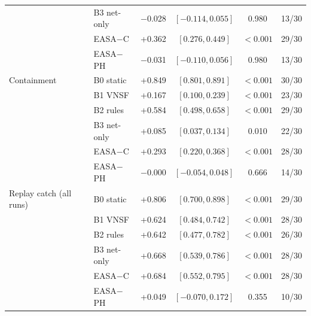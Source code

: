\begin{table}[!t]
\begin{tabular}{llcccc}
 & B3 net-only & $-$0.028 & $[-0.114, 0.055]$ & 0.980 & 13/30 \\
 & EASA$-$C & +0.362 & $[0.276, 0.449]$ & $<0.001$ & 29/30 \\
 & EASA$-$PH & $-$0.031 & $[-0.110, 0.056]$ & 0.980 & 13/30 \\
\midrule
Containment & B0 static & +0.849 & $[0.801, 0.891]$ & $<0.001$ & 30/30 \\
 & B1 VNSF & +0.167 & $[0.100, 0.239]$ & $<0.001$ & 23/30 \\
 & B2 rules & +0.584 & $[0.498, 0.658]$ & $<0.001$ & 29/30 \\
 & B3 net-only & +0.085 & $[0.037, 0.134]$ & 0.010 & 22/30 \\
 & EASA$-$C & +0.293 & $[0.220, 0.368]$ & $<0.001$ & 28/30 \\
 & EASA$-$PH & $-$0.000 & $[-0.054, 0.048]$ & 0.666 & 14/30 \\
\midrule
Replay catch (all runs) & B0 static & +0.806 & $[0.700, 0.898]$ & $<0.001$ & 29/30 \\
 & B1 VNSF & +0.624 & $[0.484, 0.742]$ & $<0.001$ & 28/30 \\
 & B2 rules & +0.642 & $[0.477, 0.782]$ & $<0.001$ & 26/30 \\
 & B3 net-only & +0.668 & $[0.539, 0.786]$ & $<0.001$ & 28/30 \\
 & EASA$-$C & +0.684 & $[0.552, 0.795]$ & $<0.001$ & 28/30 \\
 & EASA$-$PH & +0.049 & $[-0.070, 0.172]$ & 0.355 & 10/30 \\
\bottomrule
\end{tabular}
\end{table}
